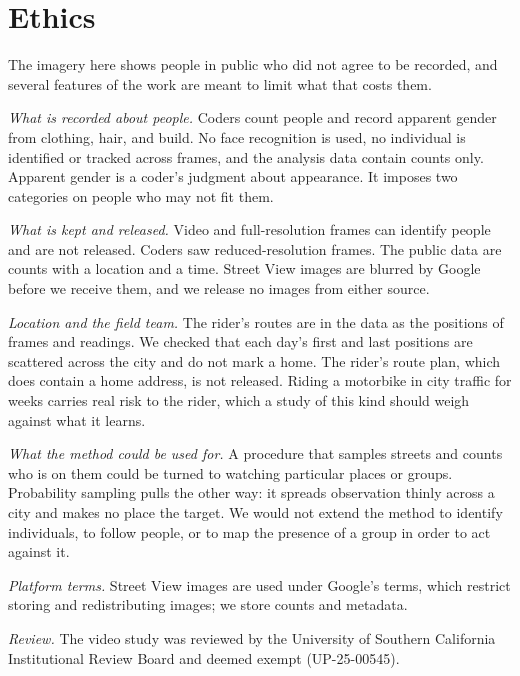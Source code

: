 \documentclass[11pt]{article}
\begin{document}
\section{Ethics}

The imagery here shows people in public who did not agree to be recorded, and several features of the work are meant to limit what that costs them.

\emph{What is recorded about people.} Coders count people and record apparent gender from clothing, hair, and build. No face recognition is used, no individual is identified or tracked across frames, and the analysis data contain counts only. Apparent gender is a coder's judgment about appearance. It imposes two categories on people who may not fit them.

\emph{What is kept and released.} Video and full-resolution frames can identify people and are not released. Coders saw reduced-resolution frames. The public data are counts with a location and a time. Street View images are blurred by Google before we receive them, and we release no images from either source.

\emph{Location and the field team.} The rider's routes are in the data as the positions of frames and readings. We checked that each day's first and last positions are scattered across the city and do not mark a home. The rider's route plan, which does contain a home address, is not released. Riding a motorbike in city traffic for weeks carries real risk to the rider, which a study of this kind should weigh against what it learns.

\emph{What the method could be used for.} A procedure that samples streets and counts who is on them could be turned to watching particular places or groups. Probability sampling pulls the other way: it spreads observation thinly across a city and makes no place the target. We would not extend the method to identify individuals, to follow people, or to map the presence of a group in order to act against it.

\emph{Platform terms.} Street View images are used under Google's terms, which restrict storing and redistributing images; we store counts and metadata.

\emph{Review.} The video study was reviewed by the University of Southern California Institutional Review Board and deemed exempt (UP-25-00545).
\end{document}
